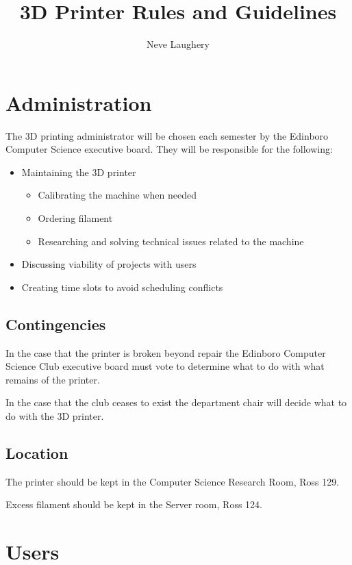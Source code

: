 \documentclass{article}
\title{3D Printer Rules and Guidelines}
\author{Neve Laughery}
\begin{document}
\maketitle

\section{Administration}

The 3D printing administrator will be chosen each semester by the Edinboro Computer Science executive board. They will be responsible for the following:

\begin{itemize}
	\item Maintaining the 3D printer
	\begin{itemize}
		\item Calibrating the machine when needed
		\item Ordering filament
		\item Researching and solving technical issues related to the machine
	\end{itemize}
	\item Discussing viability of projects with users
	\item Creating time slots to avoid scheduling conflicts
\end{itemize}

\subsection{Contingencies}

In the case that the printer is broken beyond repair the Edinboro Computer Science Club executive board must vote to determine what to do with what remains of the printer.

In the case that the club ceases to exist the department chair will decide what to do with the 3D printer.

\subsection{Location}

The printer should be kept in the Computer Science Research Room, Ross 129.

Excess filament should be kept in the Server room, Ross 124.

\section{Users}
\end{document}
